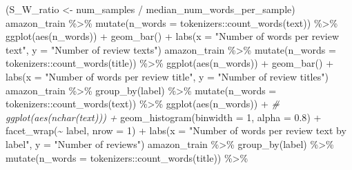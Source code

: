 \documentclass[
]{article}
\newenvironment{Shaded}{}{}
\newcommand{\AttributeTok}[1]{\textcolor[rgb]{0.49,0.56,0.16}{#1}}
\newcommand{\CommentTok}[1]{\textcolor[rgb]{0.38,0.63,0.69}{\textit{#1}}}
\newcommand{\DecValTok}[1]{\textcolor[rgb]{0.25,0.63,0.44}{#1}}
\newcommand{\FloatTok}[1]{\textcolor[rgb]{0.25,0.63,0.44}{#1}}
\newcommand{\FunctionTok}[1]{\textcolor[rgb]{0.02,0.16,0.49}{#1}}
\newcommand{\NormalTok}[1]{#1}
\newcommand{\OtherTok}[1]{\textcolor[rgb]{0.00,0.44,0.13}{#1}}
\newcommand{\SpecialCharTok}[1]{\textcolor[rgb]{0.25,0.44,0.63}{#1}}
\newcommand{\StringTok}[1]{\textcolor[rgb]{0.25,0.44,0.63}{#1}}
\begin{document}
\begin{Shaded}
\begin{Highlighting}[]
\NormalTok{(S\_W\_ratio }\OtherTok{\textless{}{-}}\NormalTok{ num\_samples }\SpecialCharTok{/}\NormalTok{ median\_num\_words\_per\_sample)}
\NormalTok{amazon\_train }\SpecialCharTok{\%\textgreater{}\%}
  \FunctionTok{mutate}\NormalTok{(}\AttributeTok{n\_words =}\NormalTok{ tokenizers}\SpecialCharTok{::}\FunctionTok{count\_words}\NormalTok{(text)) }\SpecialCharTok{\%\textgreater{}\%}
  \FunctionTok{ggplot}\NormalTok{(}\FunctionTok{aes}\NormalTok{(n\_words)) }\SpecialCharTok{+}
  \FunctionTok{geom\_bar}\NormalTok{() }\SpecialCharTok{+}
  \FunctionTok{labs}\NormalTok{(}\AttributeTok{x =} \StringTok{"Number of words per review text"}\NormalTok{,}
       \AttributeTok{y =} \StringTok{"Number of review texts"}\NormalTok{)}
\NormalTok{amazon\_train }\SpecialCharTok{\%\textgreater{}\%}
  \FunctionTok{mutate}\NormalTok{(}\AttributeTok{n\_words =}\NormalTok{ tokenizers}\SpecialCharTok{::}\FunctionTok{count\_words}\NormalTok{(title)) }\SpecialCharTok{\%\textgreater{}\%}
  \FunctionTok{ggplot}\NormalTok{(}\FunctionTok{aes}\NormalTok{(n\_words)) }\SpecialCharTok{+}
  \FunctionTok{geom\_bar}\NormalTok{() }\SpecialCharTok{+}
  \FunctionTok{labs}\NormalTok{(}\AttributeTok{x =} \StringTok{"Number of words per review title"}\NormalTok{,}
       \AttributeTok{y =} \StringTok{"Number of review titles"}\NormalTok{)}
\NormalTok{amazon\_train }\SpecialCharTok{\%\textgreater{}\%}
  \FunctionTok{group\_by}\NormalTok{(label) }\SpecialCharTok{\%\textgreater{}\%}
  \FunctionTok{mutate}\NormalTok{(}\AttributeTok{n\_words =}\NormalTok{ tokenizers}\SpecialCharTok{::}\FunctionTok{count\_words}\NormalTok{(text)) }\SpecialCharTok{\%\textgreater{}\%}
  \FunctionTok{ggplot}\NormalTok{(}\FunctionTok{aes}\NormalTok{(n\_words)) }\SpecialCharTok{+}
  \CommentTok{\# ggplot(aes(nchar(text))) +}
  \FunctionTok{geom\_histogram}\NormalTok{(}\AttributeTok{binwidth =} \DecValTok{1}\NormalTok{, }\AttributeTok{alpha =} \FloatTok{0.8}\NormalTok{) }\SpecialCharTok{+}
  \FunctionTok{facet\_wrap}\NormalTok{(}\SpecialCharTok{\textasciitilde{}}\NormalTok{ label, }\AttributeTok{nrow =} \DecValTok{1}\NormalTok{) }\SpecialCharTok{+}
  \FunctionTok{labs}\NormalTok{(}\AttributeTok{x =} \StringTok{"Number of words per review text by label"}\NormalTok{,}
       \AttributeTok{y =} \StringTok{"Number of reviews"}\NormalTok{)}
\NormalTok{amazon\_train }\SpecialCharTok{\%\textgreater{}\%}
  \FunctionTok{group\_by}\NormalTok{(label) }\SpecialCharTok{\%\textgreater{}\%}
  \FunctionTok{mutate}\NormalTok{(}\AttributeTok{n\_words =}\NormalTok{ tokenizers}\SpecialCharTok{::}\FunctionTok{count\_words}\NormalTok{(title)) }\SpecialCharTok{\%\textgreater{}\%}

\end{Highlighting}
\end{Shaded}
\end{document}
